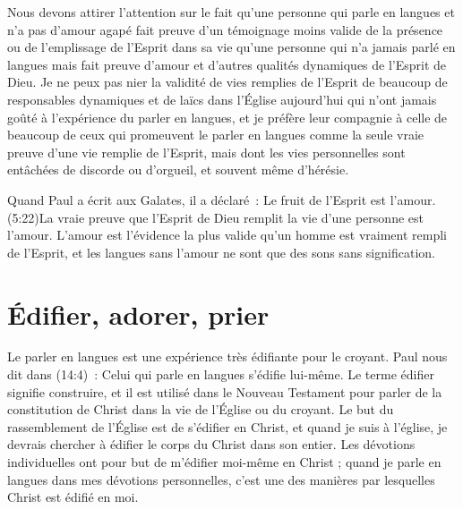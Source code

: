Nous devons attirer l'attention sur le fait qu'une personne qui parle
 en langues et n'a pas d'amour agapé fait preuve d'un témoignage
 moins valide de la présence ou de l'emplissage de l'Esprit dans sa vie
 qu'une personne qui n'a jamais parlé en langues mais fait preuve d'amour
 et d'autres qualités dynamiques de l'Esprit de Dieu.
 Je ne peux pas nier la validité de vies remplies de l'Esprit de beaucoup
 de responsables dynamiques et de laïcs dans l'Église aujourd'hui
 qui n'ont jamais goûté à l'expérience du parler en langues,
 et je préfère leur compagnie à celle de beaucoup de ceux qui promeuvent
 le parler en langues comme la seule vraie preuve d'une vie remplie
 de l'Esprit, mais dont les vies personnelles sont entâchées de discorde
 ou d'orgueil, et souvent même d'hérésie.

Quand Paul a écrit aux Galates, il a déclaré~:
 \og Le fruit de l'Esprit est l'amour. \fg{}(5:22)La vraie preuve que l'Esprit de Dieu remplit la vie d'une personne
 est l'amour. L'amour est l'évidence la plus valide qu'un homme
 est vraiment rempli de l'Esprit, et les langues sans l'amour
 ne sont que des sons sans signification.


\section*{Édifier, adorer, prier}

\begin{specialpar}{}
Le parler en langues est une expérience très édifiante pour le croyant.
 Paul nous dit dans (14:4)~:
 \og Celui qui parle en langues s'édifie lui-même. \fg{}
 Le terme \og édifier \fg{} signifie construire, et il est utilisé
 dans le Nouveau Testament pour parler de la constitution de Christ
 dans la vie de l'Église ou du croyant. Le but du rassemblement de l'Église
 est de s'édifier en Christ, et quand je suis à l'église,
 je devrais chercher à édifier le corps du Christ dans son entier.
 Les dévotions individuelles ont pour but de m'édifier moi-même en Christ ;
 quand je parle en langues dans mes dévotions personnelles,
 c'est une des manières par lesquelles Christ est édifié en moi.
\end{specialpar}

